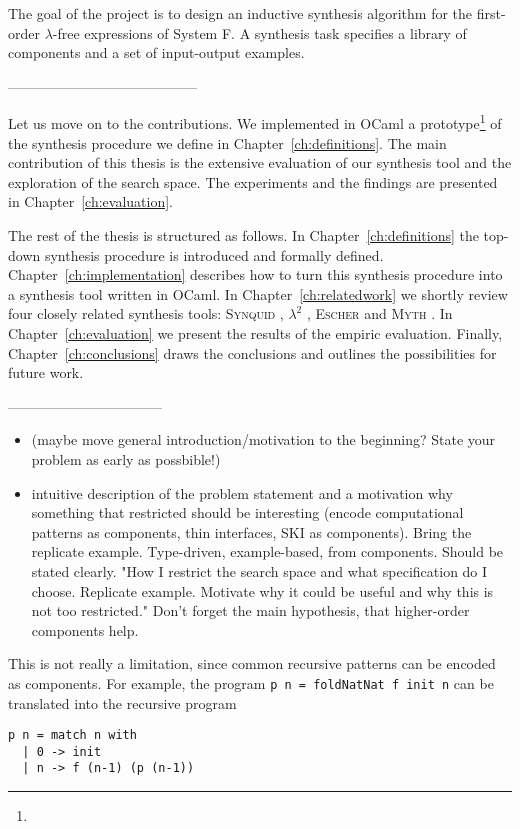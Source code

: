 The goal of the project is to design an inductive synthesis algorithm for the first-order $\lambda$-free expressions of System F. A synthesis task specifies a library of components and a set of input-output examples. 

-----------------------------------------

Let us move on to the contributions. We implemented in OCaml a prototype\footnote{} of the synthesis procedure we define in Chapter~\ref{ch:definitions}. The main contribution of this thesis is the extensive evaluation of our synthesis tool and the exploration of the search space. The experiments and the findings are presented in Chapter~\ref{ch:evaluation}.

The rest of the thesis is structured as follows. In Chapter~\ref{ch:definitions} the top-down synthesis procedure is introduced and formally defined. Chapter~\ref{ch:implementation} describes how to turn this synthesis procedure into a synthesis tool written in OCaml. In Chapter~\ref{ch:relatedwork} we shortly review four closely related synthesis tools: \textsc{Synquid} \cite{SynquidPaper}, $\lambda^2$ \cite{LambdaSquarePaper}, \textsc{Escher} \cite{EscherPaper} and \textsc{Myth} \cite{MythPaper}. In Chapter~\ref{ch:evaluation} we present the results of the empiric evaluation. Finally, Chapter~\ref{ch:conclusions} draws the conclusions and outlines the possibilities for future work.

---------------------------------


\begin{itemize}
\item (maybe move general introduction/motivation to the beginning? State your problem as early as possbible!)
\item intuitive description of the problem statement and a motivation why something that restricted should be interesting (encode computational patterns as components, thin interfaces, SKI as components). Bring the replicate example. Type-driven, example-based, from components. Should be stated clearly. "How I restrict the search space and what specification do I choose. Replicate example. Motivate why it could be useful and why this is not too restricted." Don't forget the main hypothesis, that higher-order components help.
\end{itemize} 


This is not really a limitation, since common recursive patterns can be encoded as components. For example, the program \lstinline!p n = foldNatNat f init n! can be translated into the recursive program
\begin{lstlisting}[style=plain]
p n = match n with
  | 0 -> init
  | n -> f (n-1) (p (n-1))
\end{lstlisting}  

